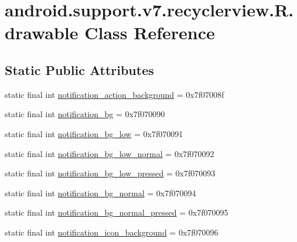 \hypertarget{classandroid_1_1support_1_1v7_1_1recyclerview_1_1R_1_1drawable}{}\section{android.\+support.\+v7.\+recyclerview.\+R.\+drawable Class Reference}
\label{classandroid_1_1support_1_1v7_1_1recyclerview_1_1R_1_1drawable}
\subsection*{Static Public Attributes}
\begin{DoxyCompactItemize}
\item 
static final int \mbox{\hyperlink{classandroid_1_1support_1_1v7_1_1recyclerview_1_1R_1_1drawable_a94ca1a9850cea62dab00fb3505930a59}{notification\+\_\+action\+\_\+background}} = 0x7f07008f
\item 
static final int \mbox{\hyperlink{classandroid_1_1support_1_1v7_1_1recyclerview_1_1R_1_1drawable_a0bf2ac43c54dd606778a2e103013605f}{notification\+\_\+bg}} = 0x7f070090
\item 
static final int \mbox{\hyperlink{classandroid_1_1support_1_1v7_1_1recyclerview_1_1R_1_1drawable_a42699770e49598db6ff90796106e7b81}{notification\+\_\+bg\+\_\+low}} = 0x7f070091
\item 
static final int \mbox{\hyperlink{classandroid_1_1support_1_1v7_1_1recyclerview_1_1R_1_1drawable_a49407e99ee20b81ba38cb9c26f8fde91}{notification\+\_\+bg\+\_\+low\+\_\+normal}} = 0x7f070092
\item 
static final int \mbox{\hyperlink{classandroid_1_1support_1_1v7_1_1recyclerview_1_1R_1_1drawable_a2dd97900efe14bbb29bbbd9cdd6eb9e7}{notification\+\_\+bg\+\_\+low\+\_\+pressed}} = 0x7f070093
\item 
static final int \mbox{\hyperlink{classandroid_1_1support_1_1v7_1_1recyclerview_1_1R_1_1drawable_a3910d3d1677858ab7237dffb0d693d80}{notification\+\_\+bg\+\_\+normal}} = 0x7f070094
\item 
static final int \mbox{\hyperlink{classandroid_1_1support_1_1v7_1_1recyclerview_1_1R_1_1drawable_a75d2619b0abb694006ea86fbe5dbbd8d}{notification\+\_\+bg\+\_\+normal\+\_\+pressed}} = 0x7f070095
\item 
static final int \mbox{\hyperlink{classandroid_1_1support_1_1v7_1_1recyclerview_1_1R_1_1drawable_aea2f3dfe59f21f41485aba2f00aa8a88}{notification\+\_\+icon\+\_\+background}} = 0x7f070096

\end{DoxyCompactItemize}

